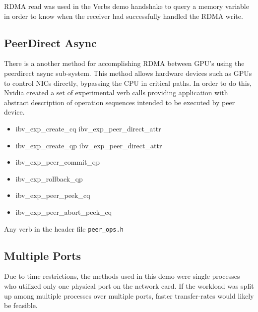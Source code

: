 \documentclass[a4paper,onecolumn]{article}
\begin{document}
RDMA read was used in the Verbs demo handshake to query a memory variable in order to know when the receiver had successfully handled the RDMA write.

\subsection{PeerDirect Async}
There is a another method for accomplishing RDMA between GPU's using the peerdirect async sub-system. This method allows hardware devices such as GPUs to control NICs directly, bypassing the CPU in critical paths. In order to do this, Nvidia created a set of experimental verb calls providing application with abstract description of operation sequences intended to be executed by peer device.

\begin{itemize}
   \item ibv\_exp\_create\_cq
   \subitem ibv\_exp\_peer\_direct\_attr
   \item ibv\_exp\_create\_qp
   \subitem ibv\_exp\_peer\_direct\_attr
   \item ibv\_exp\_peer\_commit\_qp
   \item ibv\_exp\_rollback\_qp
   \item ibv\_exp\_peer\_peek\_cq
   \item ibv\_exp\_peer\_abort\_peek\_cq
 \end{itemize}

    Any verb in the header file \verb|peer_ops.h|

\subsection{Multiple Ports}
Due to time restrictions, the methods used in this demo were single processes who utilized only one physical port on the network card. If the workload was split up among multiple processes over multiple ports, faster transfer-rates would likely be feasible. 

\pagebreak


\end{document}

